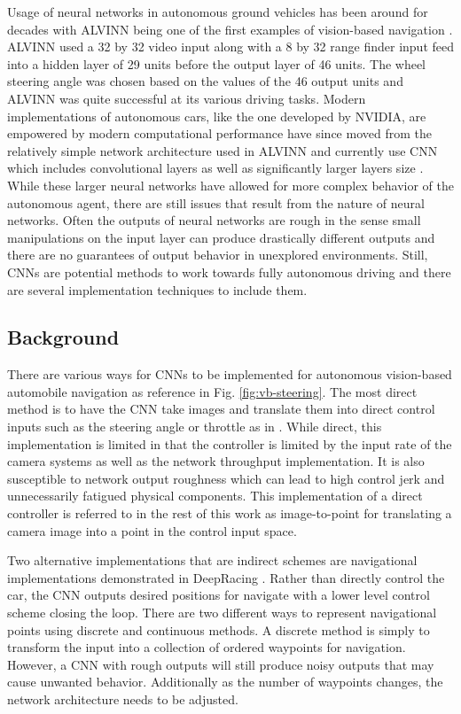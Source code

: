 \documentclass[conference]{IEEEtran}
\begin{document}
Usage of neural networks in autonomous ground vehicles has been around for decades with ALVINN being one of the first examples of vision-based navigation \cite{pomerieau-1989}. ALVINN used a 32 by 32 video input along with a 8 by 32 range finder input feed into a hidden layer of 29 units before the output layer of 46 units. The wheel steering angle was chosen based on the values of the 46 output units and ALVINN was quite successful at its various driving tasks. Modern implementations of autonomous cars, like the one developed by NVIDIA, are empowered by modern computational performance have since moved from the relatively simple network architecture used in ALVINN and currently use CNN which includes convolutional layers as well as significantly larger layers size \cite{bojarski2016end}. While these larger neural networks have allowed for more complex behavior of the autonomous agent, there are still issues that result from the nature of neural networks. Often the outputs of neural networks are rough in the sense  small manipulations on the input layer can produce drastically different outputs and there are no guarantees of output behavior in unexplored environments. Still, CNNs are potential methods to work towards fully autonomous driving and there are several implementation techniques to include them.

\subsection{Background}

There are various ways for CNNs to be implemented for autonomous vision-based automobile navigation as reference in Fig. \ref{fig:vb-steering}. The most direct method is to have the CNN take images and translate them into direct control inputs such as the steering angle or throttle as in \cite{bechtel2018}. While direct, this implementation is limited in that the controller is limited by the input rate of the camera systems as well as the network throughput implementation. It is also susceptible to network output roughness which can lead to high control jerk and unnecessarily fatigued physical components. This implementation of a direct controller is referred to in the rest of this work as image-to-point for translating a camera image into a point in the control input space.

Two alternative implementations that are indirect schemes are navigational implementations demonstrated in DeepRacing \cite{trent2020iros}. Rather than directly control the car, the CNN outputs desired positions for navigate with a lower level control scheme closing the loop. There are two different ways to represent navigational points using discrete and continuous methods. A discrete method is simply to transform the input into a collection of ordered waypoints for navigation. However, a CNN with rough outputs will still produce noisy outputs that may cause unwanted behavior. Additionally as the number of waypoints changes, the network architecture needs to be adjusted.
\end{document}
